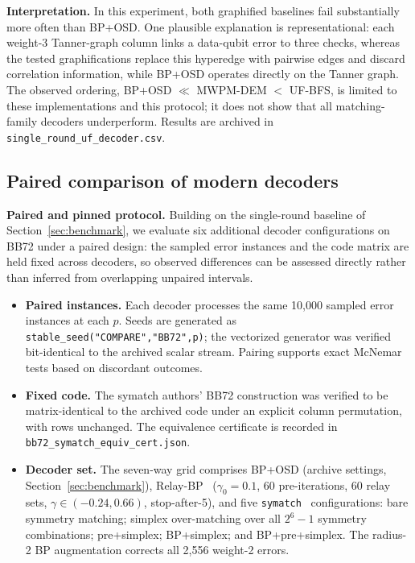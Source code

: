\documentclass[pdflatex,sn-mathphys-num]{sn-jnl}
\theoremstyle{thmstyleone}
\theoremstyle{thmstyletwo}
\theoremstyle{thmstylethree}
\begin{document}
\noindent\textbf{Interpretation.} In this experiment, both graphified baselines fail substantially more often than BP+OSD. One plausible explanation is representational: each weight-3 Tanner-graph column links a data-qubit error to three checks, whereas the tested graphifications replace this hyperedge with pairwise edges and discard correlation information, while BP+OSD operates directly on the Tanner graph. The observed ordering, BP+OSD $\ll$ MWPM-DEM $<$ UF-BFS, is limited to these implementations and this protocol; it does not show that all matching-family decoders underperform. Results are archived in \texttt{single\_round\_uf\_decoder.csv}.

\subsection{Paired comparison of modern decoders}
\label{sec:comparator}

\noindent\textbf{Paired and pinned protocol.} Building on the single-round baseline of Section~\ref{sec:benchmark}, we evaluate six additional decoder configurations on BB72 under a paired design: the sampled error instances and the code matrix are held fixed across decoders, so observed differences can be assessed directly rather than inferred from overlapping unpaired intervals.

\begin{itemize}
  \item \textbf{Paired instances.} Each decoder processes the same 10{,}000 sampled error instances at each $p$. Seeds are generated as \texttt{stable\_seed("COMPARE","BB72",p)}; the vectorized generator was verified bit-identical to the archived scalar stream. Pairing supports exact McNemar tests based on discordant outcomes.
  \item \textbf{Fixed code.} The symatch authors' BB72 construction was verified to be matrix-identical to the archived code under an explicit column permutation, with rows unchanged. The equivalence certificate is recorded in \texttt{bb72\_symatch\_equiv\_cert.json}.
  \item \textbf{Decoder set.} The seven-way grid comprises BP+OSD (archive settings, Section~\ref{sec:benchmark}), Relay-BP~\cite{Muller2025relay} ($\gamma_0=0.1$, 60 pre-iterations, 60 relay sets, $\gamma\in(-0.24,0.66)$, stop-after-5), and five \texttt{symatch}~\cite{SahayBrown2026} configurations: bare symmetry matching; simplex over-matching over all $2^6-1$ symmetry combinations; pre+simplex; BP+simplex; and BP+pre+simplex. The radius-2 BP augmentation corrects all 2{,}556 weight-2 errors.
\end{itemize}
\end{document}

